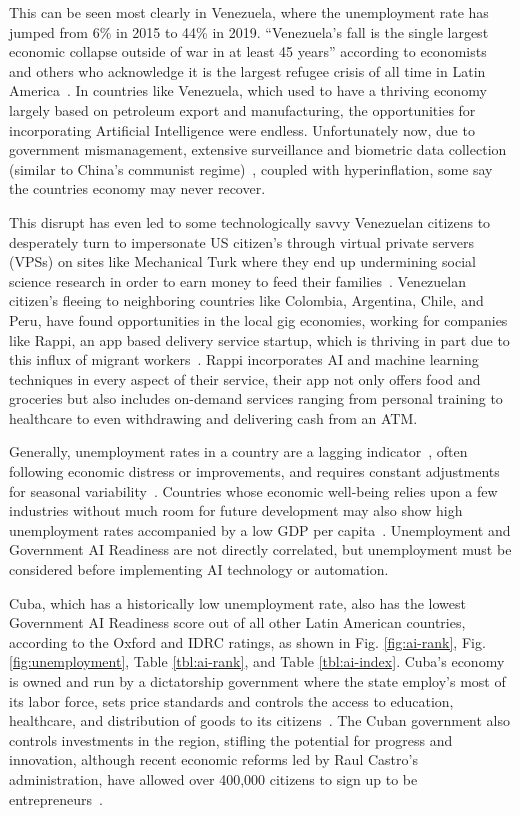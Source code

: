 \documentclass[conference]{IEEEtran}
\begin{document}
This can be seen most clearly in Venezuela, where the unemployment rate has jumped from 6\% in 2015 to 44\% in 2019. ``Venezuela's fall is the single largest economic collapse outside of war in at least 45 years'' according to economists and others who acknowledge it is the largest refugee crisis of all time in Latin America~\cite{kurmanaev2019venezuela}. In countries like Venezuela, which used to have a thriving economy largely based on petroleum export and manufacturing, the opportunities for incorporating Artificial Intelligence were endless. Unfortunately now, due to government mismanagement, extensive surveillance and biometric data collection (similar to China's communist regime)~\cite{berwick2018how}, coupled with hyperinflation, some say the countries economy may never recover.

This disrupt has even led to some technologically savvy Venezuelan citizens to desperately turn to impersonate US citizen's through virtual private servers (VPSs) on sites like Mechanical Turk where they end up undermining social science research in order to earn money to feed their families~\cite{kennedy2018venezuela}. Venezuelan citizen's fleeing to neighboring countries like Colombia, Argentina, Chile, and Peru, have found opportunities in the local gig economies, working for companies like Rappi, an app based delivery service startup, which is thriving in part due to this influx of migrant workers~\cite{wyss2019how}. Rappi incorporates AI and machine learning techniques in every aspect of their service, their app not only offers food and groceries but also includes on-demand services ranging from personal training to healthcare to even withdrawing and delivering cash from an ATM.

Generally, unemployment rates in a country are a lagging indicator~\cite{cain1979unemployment}, often following economic distress or improvements, and requires constant adjustments for seasonal variability~\cite{haynes1996unemployment}. Countries whose economic well-being relies upon a few industries without much room for future development may also show high unemployment rates accompanied by a low GDP per capita~\cite{frenkel2006unemployment}. Unemployment and Government AI Readiness are not directly correlated, but unemployment must be considered before implementing AI technology or automation.

Cuba, which has a historically low unemployment rate, also has the lowest Government AI Readiness score out of all other Latin American countries, according to the Oxford and IDRC ratings, as shown in Fig. \ref{fig:ai-rank}, Fig. \ref{fig:unemployment}, Table \ref{tbl:ai-rank}, and Table \ref{tbl:ai-index}. Cuba's economy is owned and run by a dictatorship government where the state employ's most of its labor force, sets price standards and controls the access to education, healthcare, and distribution of goods to its citizens~\cite{smith2016understanding}. The Cuban government also controls investments in the region, stifling the potential for progress and innovation, although recent economic reforms led by Raul Castro's administration, have allowed over 400,000 citizens to sign up to be entrepreneurs~\cite{feinberg2012new}.
\end{document}

